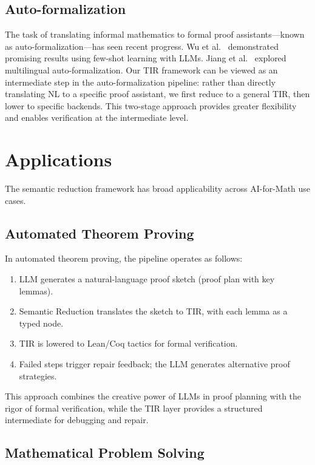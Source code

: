 \documentclass[11pt,a4paper]{article}
\begin{document}
\subsection{Auto-formalization}

The task of translating informal mathematics to formal proof assistants---known as auto-formalization---has seen recent progress. Wu et al.~\cite{wu2022autoformalization} demonstrated promising results using few-shot learning with LLMs. Jiang et al.~\cite{jiang2023multilingual} explored multilingual auto-formalization. Our TIR framework can be viewed as an intermediate step in the auto-formalization pipeline: rather than directly translating NL to a specific proof assistant, we first reduce to a general TIR, then lower to specific backends. This two-stage approach provides greater flexibility and enables verification at the intermediate level.

\section{Applications}
\label{sec:applications}

The semantic reduction framework has broad applicability across AI-for-Math use cases.

\subsection{Automated Theorem Proving}

In automated theorem proving, the pipeline operates as follows:
\begin{enumerate}[leftmargin=*]
    \item LLM generates a natural-language proof sketch (proof plan with key lemmas).
    \item Semantic Reduction translates the sketch to TIR, with each lemma as a typed node.
    \item TIR is lowered to Lean/Coq tactics for formal verification.
    \item Failed steps trigger repair feedback; the LLM generates alternative proof strategies.
\end{enumerate}
This approach combines the creative power of LLMs in proof planning with the rigor of formal verification, while the TIR layer provides a structured intermediate for debugging and repair.

\subsection{Mathematical Problem Solving}
\end{document}
